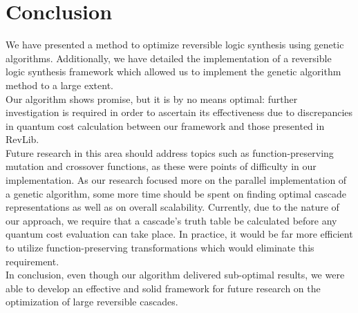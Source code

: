 \section{Conclusion}
We have presented a method to optimize reversible logic synthesis using genetic algorithms. Additionally, we have detailed the implementation of a reversible logic synthesis framework which allowed us to implement the genetic algorithm method to a large extent. \\

Our algorithm shows promise, but it is by no means optimal: further investigation is required in order to ascertain its effectiveness due to discrepancies in quantum cost calculation between our framework and those presented in RevLib. \\

Future research in this area should address topics such as function-preserving mutation and crossover functions, as these were points of difficulty in our implementation. As our research focused more on the parallel implementation of a genetic algorithm, some more time should be spent on finding optimal cascade representations as well as on overall scalability. Currently, due to the nature of our approach, we require that a cascade's truth table be calculated before any quantum cost evaluation can take place. In practice, it would be far more efficient to utilize function-preserving transformations which would eliminate this requirement. \\

In conclusion, even though our algorithm delivered sub-optimal results, we were able to develop an effective and solid framework for future research on the optimization of large reversible cascades.


